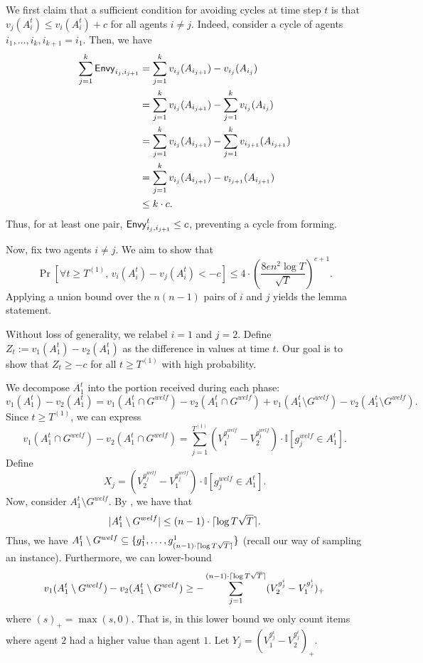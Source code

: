     We first claim that a sufficient condition for avoiding cycles at time step $t$ is that $v_j(A^t_i)   \le v_i(A^t_i)  + c$ for all agents $i \ne j$. Indeed, consider a cycle of agents $i_1, \ldots, i_k, i_{k+1}=i_1$. Then, we have \begin{align*}
        \sum_{j = 1}^k \mathsf{Envy}_{i_{j}, i_{j + 1}}  &= \sum_{j = 1}^k v_{i_j}(A_{i_{j + 1}}) - v_{i_j}(A_{i_j})\\
        &= \sum_{j = 1}^k v_{i_j}(A_{i_{j + 1}}) - \sum_{j = 1}^k v_{i_j}(A_{i_j})\\
        &= \sum_{j = 1}^k v_{i_j}(A_{i_{j + 1}}) - \sum_{j = 1}^k v_{i_{j+1}}(A_{i_{j+1}})\\
        &= \sum_{j = 1}^k v_{i_j}(A_{i_{j + 1}}) - v_{i_{j + 1}}(A_{i_{j + 1}})\\
        &\le k \cdot c.
    \end{align*}
    Thus, for at least one pair, $\mathsf{Envy}^t_{i_j, i_{j + 1}} \le c$, preventing a cycle from forming.

    Now, fix two agents $i \ne j$. We aim to show that
    \[
        \Pr[\forall t \ge T^{(1)}, \, v_i(A^t_i) -  v_j(A^t_i) < - c] \le 4 \cdot \left(\frac{8 e n^2 \log T}{\sqrt{T}} \right)^{c + 1}. 
    \]
    Applying a union bound over the $n(n - 1)$ pairs of $i$ and $j$ yields the lemma statement.

    Without loss of generality, we relabel $i = 1$ and $j = 2$. Define $Z_t := v_1(A^t_1) - v_2(A^t_1)$ as the difference in values at time $t$. Our goal is to show that $Z_t \ge -c$ for all $t \ge T^{(1)}$ with high probability.

    We decompose $A^t_1$ into the portion received during each phase:
    \[
        v_1(A^t_1) - v_2(A^t_1) = v_1(A^t_1 \cap G^{welf} ) - v_2(A^t_1 \cap G^{welf} ) + v_1(A^t_1 \setminus G^{welf}) - v_2(A^t_1 \setminus G^{welf}). 
    \]
    Since $t \ge T^{(1)}$, we can express 
    \[
         v_1(A^t_1 \cap G^{welf} ) - v_2(A^t_1 \cap G^{welf} ) = \sum_{j = 1}^{T^{(1)}} \left(V^{g^{welf}_j}_1 - V^{g^{welf}_j}_2 \right)  \cdot \mathbb{I}[g^{welf}_j \in A^t_1].
    \]
    Define \[X_j = \left(V^{g^{welf}_j}_2 - V^{g^{welf}_j}_1 \right)  \cdot \mathbb{I}[g^{welf}_j \in A^t_1].\]
    Now, consider $A^t_1 \setminus G^{welf}$. By , we have that \[|A^t_1 \setminus G^{welf}| \le (n - 1) \cdot \lceil\log T \sqrt{T}\rceil.\] 
    Thus, we have $A^t_1 \setminus G^{welf} \subseteq \{g^1_1, \ldots, g^1_{(n - 1) \cdot \lceil\log T \sqrt{T}\rceil} \}$ (recall our way of sampling an instance). Furthermore, we can lower-bound 
    \[v_1(A^t_1 \setminus G^{welf}) - v_2(A^t_1 \setminus G^{welf}) \ge -  \sum_{j = 1}^{(n - 1) \cdot \lceil\log T \sqrt{T}\rceil} (V^{g^i_j}_2 - V^{g^i_j}_1)_+\] where $(s)_+ = \max(s, 0)$. That is, in this lower bound we only count items where agent $2$ had a higher value than agent $1$. Let $Y_j = (V^{g^i_j}_1 - V^{g^i_j}_2)_+$.
    
